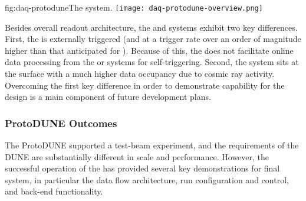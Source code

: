 \begin{dunefigure}{fig:daq-protodune}{The   system.}
  \texttt{[image: daq-protodune-overview.png]}
\end{dunefigure}

Besides overall readout architecture, the  and   systems exhibit two key differences. 
First, the   is externally triggered (and at a trigger rate over an order of magnitude higher than that anticipated for ). Because of this, the   does not facilitate online data processing from the  or  systems for self-triggering. 
Second, the  system sits at the surface with a much higher data occupancy due to cosmic ray activity.
Overcoming the first key difference in order to demonstrate  capability for the   design is a main component of future  development plans.


\subsubsection{ProtoDUNE Outcomes}

The ProtoDUNE  supported a test-beam experiment, and the requirements of the DUNE  are substantially different in scale and performance.
However, the successful operation of the   has provided several key demonstrations for final system, in particular the data flow architecture, run configuration and control, and back-end functionality.

